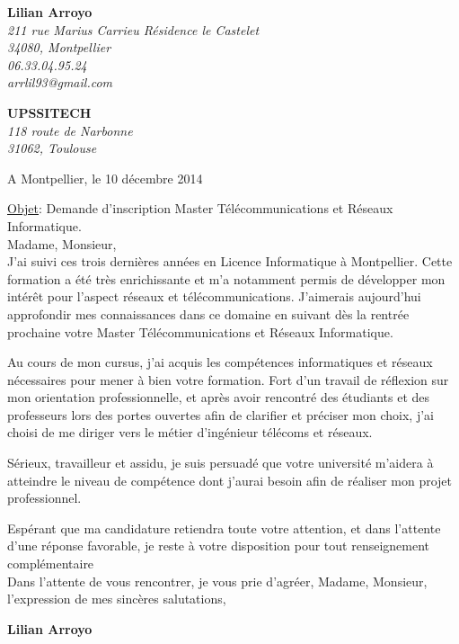 \documentclass[11pt]{letter}
\begin{document}
 \sffamily
 \hfill

 \begin{flushleft}
 {\bfseries Lilian Arroyo}\\[.35ex]
 \small\itshape
 211 rue Marius Carrieu Résidence le Castelet\\
 34080, Montpellier\\[.35ex]
 06.33.04.95.24\\
 arrlil93@gmail.com
 \end{flushleft}
 
 \begin{flushright}
 {\bfseries UPSSITECH}\\[.35ex]
 \small\itshape
 118 route de Narbonne\\
 31062, Toulouse
 \end{flushright}
 
 \hfill
 
 \begin{flushright}
 A Montpellier, le 10 décembre 2014\\
 \end{flushright}
 
 \underline{Objet}: Demande d’inscription Master Télécommunications et Réseaux Informatique.\\
 
 Madame, Monsieur,\\
 
J’ai suivi ces trois dernières années en Licence Informatique à Montpellier. Cette formation a été très enrichissante et m’a notamment permis de développer mon intérêt pour l’aspect réseaux et télécommunications. J’aimerais aujourd’hui approfondir mes connaissances dans ce domaine en suivant dès la rentrée prochaine votre Master Télécommunications et Réseaux Informatique.

Au cours de mon cursus, j’ai acquis les compétences informatiques et réseaux nécessaires pour mener à bien votre formation. Fort d'un travail de réflexion sur mon orientation professionnelle, et après avoir rencontré des étudiants et des professeurs lors des portes ouvertes afin de clarifier et préciser mon choix, j'ai choisi de me diriger vers le métier d’ingénieur télécoms et réseaux.

Sérieux, travailleur et assidu, je suis persuadé que votre université m'aidera à atteindre le niveau de compétence dont j'aurai besoin afin de réaliser mon projet professionnel.

Espérant que ma candidature retiendra toute votre attention, et dans l’attente d’une réponse favorable, je reste à votre disposition pour tout renseignement complémentaire\\
Dans l'attente de vous rencontrer, je vous prie d'agréer, Madame, Monsieur, l'expression de mes sincères salutations,\\
 \begin{center}
 {\bfseries Lilian Arroyo}\\
 \end{center}
 \vfill
 
\end{document}
